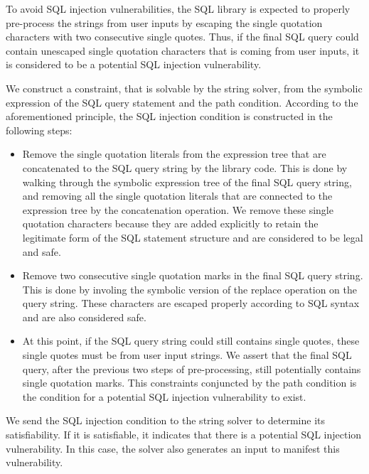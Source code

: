 \documentclass[conference]{IEEEtran}
\begin{document}
To avoid SQL injection vulnerabilities, the SQL library is expected to properly pre-process the strings from user inputs by escaping the single quotation characters with two consecutive single quotes. Thus, if the final SQL query could contain unescaped single quotation characters that is coming from user inputs, it is considered to be a potential SQL injection vulnerability.

We construct a constraint, that is solvable by the string solver, from the symbolic expression of the SQL query statement and the path condition. According to the aforementioned principle, the SQL injection condition is constructed in the following steps:

\begin{itemize}

\item Remove the single quotation literals from the expression tree that are concatenated to the SQL query string by the library code. This is done by walking through the symbolic expression tree of the final SQL query string, and removing all the single quotation literals that are connected to the expression tree by the concatenation operation. We remove these single quotation characters because they are added explicitly to retain the legitimate form of the SQL statement structure and are considered to be legal and safe.

\item Remove two consecutive single quotation marks in the final SQL query string. This is done by involing the symbolic version of the replace operation on the query string. These characters are escaped properly according to SQL syntax and are also considered safe.

\item At this point, if the SQL query string could still contains single quotes, these single quotes must be from user input strings. We assert that the final SQL query, after the previous two steps of pre-processing, still potentially contains single quotation marks. This constraints conjuncted by the path condition is the condition for a potential SQL injection vulnerability to exist. 

\end{itemize}

We send the SQL injection condition to the string solver to determine its satisfiability. If it is satisfiable, it indicates that there is a potential SQL injection vulnerability. In this case, the solver also generates an input to manifest this vulnerability.
\end{document}
